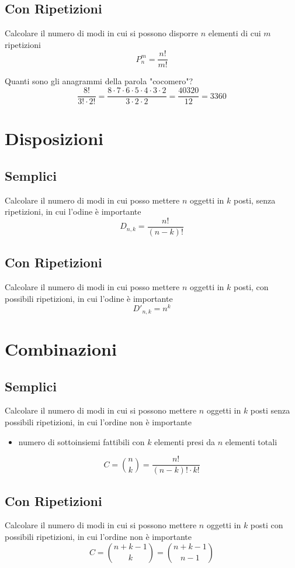 \documentclass[12pt, a4paper,oneside]{report}
\begin{document}
	\subsection{Con Ripetizioni}
	Calcolare il numero di modi in cui si possono disporre $n$ elementi di cui $m$ ripetizioni
	\[
	P_n^m=\frac{n!}{m!}
	\]
	\begin{esempio}
		Quanti sono gli anagrammi della parola "cocomero"?\\
		\[
		\frac{8!}{3!\cdot2!}=\frac{8\cdot7\cdot6\cdot5\cdot4\cdot3\cdot2}{3\cdot2\cdot2}=\frac{40320}{12}=3360
		\]
	\end{esempio}
\section{Disposizioni}
	\subsection{Semplici}
	Calcolare il numero di modi in cui posso mettere $n$ oggetti in $k$ posti, senza ripetizioni, in cui l'odine è importante
	\[
	D_{n,k}=\frac{n!}{(n-k)!}
	\]
	\subsection{Con Ripetizioni}
	Calcolare il numero di modi in cui posso mettere $n$ oggetti in $k$ posti, con possibili ripetizioni, in cui l'odine è importante
	\[
	D'_{n,k}=n^k
	\]
\section{Combinazioni}
	\subsection{Semplici}
	Calcolare il numero di modi in cui si possono mettere $n$ oggetti in $k$ posti senza possibili ripetizioni, in cui l'ordine non è importante
	\begin{itemize}
		\item numero di sottoinsiemi fattibili con $k$ elementi presi da $n$ elementi totali
	\end{itemize}
	\[
	C=\binom{n}{k}=\frac{n!}{(n-k)!\cdot k!}
	\]
	\subsection{Con Ripetizioni}
	Calcolare il numero di modi in cui si possono mettere $n$ oggetti in $k$ posti con possibili ripetizioni, in cui l'ordine non è importante
	\[
	C=\binom{n+k-1}{k}=\binom{n+k-1}{n-1}
	\]
\end{document}
